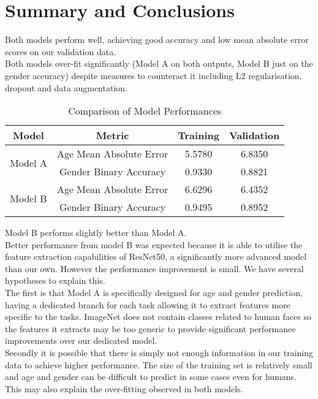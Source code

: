 \section{Summary and Conclusions}
Both models perform well, achieving good accuracy and low mean absolute error scores on our validation data.\\
Both models over-fit significantly (Model A on both outputs, Model B just on the gender accuracy) despite measures to counteract it including L2 regularisation, dropout and data augmentation.

\begin{table}[h!]
    \centering
    \begin{tabular}[h]{c|c|c|c}
        \hline
        Model & Metric & Training & Validation \\
        \hline
        \multirow{2}{4em}{Model A} & Age Mean Absolute Error & 5.5780 & 6.8350 \\
        \cline{2-4}
        & Gender Binary Accuracy & 0.9330 & 0.8821 \\
        \hline
        \multirow{2}{4em}{Model B} & Age Mean Absolute Error & 6.6296 & 6.4352 \\
        \cline{2-4}
        & Gender Binary Accuracy & 0.9495 & 0.8952 \\
        \hline
    \end{tabular}
    \caption{\label{tab:ModelPerformanceComparision}Comparison of Model Performances}
\end{table}

Model B performs slightly better than Model A. \\
Better performance from model B was expected because it is able to utilise the feature extraction capabilities of ResNet50, a significantly more advanced model than our own.
However the performance improvement is small. We have several hypotheses to explain this. \\
The first is that Model A is specifically designed for age and gender prediction, having a dedicated branch for each task allowing it to extract features more specific to the tasks. ImageNet does not contain classes related to human faces so the features it extracts may be too generic to provide significant performance improvements over our dedicated model.\\
Secondly it is possible that there is simply not enough information in our training data to achieve higher performance. The size of the training set is relatively small and age and gender can be difficult to predict in some cases even for humans. This may also explain the over-fitting observed in both models.
